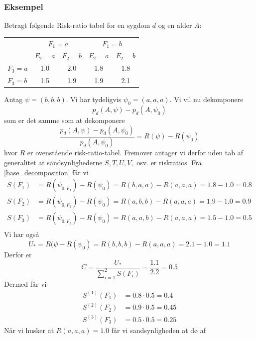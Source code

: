 \documentclass[a4paper, 12pt]{memoir}
\begin{document}
\subsubsection{Eksempel}
Betragt følgende Risk-ratio tabel for en sygdom $d$ og en alder $A$:
\begin{center}
\begin{tabular}{|l|cc|cc|}
\hline
&\multicolumn{2}{c|}{$F_1=a$}&\multicolumn{2}{c|}{$F_1=b$}\\
&$F_2=a$&$F_2=b$& $F_2=a$& $F_2=b$\\
\hline
$F_3=a$ & 1.0 &2.0 & 1.8 & 1.8\\
$F_3=b$ & 1.5 &1.9 & 1.9 & 2.1\\
\hline
\end{tabular}
\end{center}
Antag $\psi=(b,b,b)$. Vi har tydeligvis $\psi_0=(a,a,a)$. Vi vil nu dekomponere
\begin{equation}
p_d(A, \psi)-p_d(A, \psi_0)
\end{equation}
som er det samme som at dekomponere
\begin{equation}
\frac{p_d(A, \psi)-p_d(A, \psi_0)}{p_d(A, \psi_0)}=R(\psi)-R(\psi_0)
\end{equation}
hvor $R$ er ovenstående risk-ratio-tabel. Fremover antager vi derfor uden tab af generalitet at sandsynlighederne $S, T, U, V, $ osv. er riskratios. Fra \eqref{base_decomposition} får vi
\begin{align*}
S(F_1)&=R(\psi_{0,F_1})-R(\psi_0)=R(b,a,a)-R(a,a,a)=1.8-1.0=0.8\\
S(F_2)&=R(\psi_{0,F_2})-R(\psi_0)=R(a,b,b)-R(a,a,a)=1.9-1.0=0.9\\
S(F_3)&=R(\psi_{0,F_3})-R(\psi_0)=R(a,a,b)-R(a,a,a)=1.5-1.0=0.5\\
\end{align*}
Vi har også
\begin{equation*}
U_*=R(\psi-R(\psi_0)=R(b,b,b)-R(a,a,a)=2.1-1.0=1.1
\end{equation*}
Derfor er 
\begin{equation*}
C=\frac{U_*}{\sum_{i=1}^2S(F_i)}=\frac{1.1}{2.2}=0.5
\end{equation*}
Dermed får vi 
\begin{align*}
S^{(1)}(F_1)&=0.8\cdot 0.5= 0.4\\
S^{(2)}(F_2)&=0.9\cdot 0.5=  0.45 \\
S^{(3)}(F_3)&=0.5\cdot 0.5 = 0.25
\end{align*}
Når vi husker at $R(a,a,a)=1.0$ får vi sandsynligheden at dø af 
\end{document}
